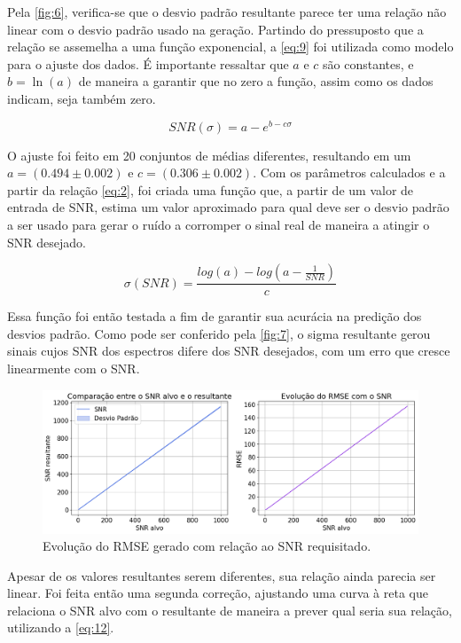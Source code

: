 \documentclass[12pt]{article}
\begin{document}
Pela \autoref{fig:6}, verifica-se que o desvio padrão resultante parece ter uma relação não linear com o desvio padrão usado na geração. Partindo do pressuposto que a relação se assemelha a uma função exponencial, a \autoref{eq:9} foi utilizada como modelo para o ajuste dos dados. É importante ressaltar que 
$a$ e $c$ são constantes, e $b = \ln(a)$ de maneira a garantir que no zero a função, assim como os dados indicam, seja também zero.

\begin{equation} \label{eq:9}
    SNR(\sigma) = a - e^{b - c\sigma} 
\end{equation}

O ajuste foi feito em 20 conjuntos de médias diferentes, resultando em um $a = (0.494 \pm 0.002)$ e $c = (0.306 \pm 0.002)$. Com os parâmetros calculados e a partir da relação \autoref{eq:2}, foi criada uma função que, a partir de um valor de entrada de SNR, estima um valor aproximado para qual deve ser o desvio padrão a ser usado para 
gerar o ruído a corromper o sinal real de maneira a atingir o SNR desejado.

\begin{equation} \label{eq:10}
    \sigma (SNR) = \frac{log(a) - log(a - \frac{1}{SNR})}{c}
\end{equation}

Essa função foi então testada a fim de garantir sua acurácia na predição dos desvios padrão. Como pode ser conferido pela \autoref{fig:7}, o sigma resultante gerou sinais cujos SNR dos espectros difere dos SNR desejados, com um erro que cresce linearmente com o SNR.

\begin{figure} [H]
    \includegraphics[scale=0.4]{evolucao-rmse-errado.png}
    \centering
    \caption{Evolução do RMSE gerado com relação ao SNR requisitado.}
    \label{fig:10}
\end{figure}

Apesar de os valores resultantes serem diferentes, sua relação ainda parecia ser linear. 
Foi feita então uma segunda correção, ajustando uma curva à reta que relaciona o SNR alvo com 
o resultante de maneira a prever qual seria sua relação, utilizando a \autoref{eq:12}.
\end{document}
